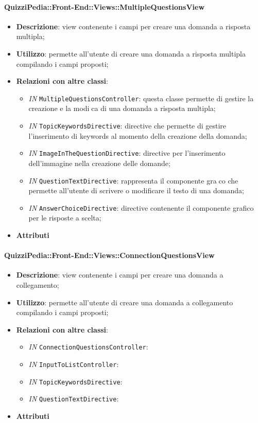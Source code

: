 \paragraph{QuizziPedia::Front-End::Views::MultipleQuestionsView}
\begin{itemize}
	\item \textbf{Descrizione}: view contenente i campi per creare una domanda a risposta multipla;
	\item \textbf{Utilizzo}: permette all'utente di creare una domanda a risposta multipla compilando i campi proposti;
	\item \textbf{Relazioni con altre classi}:
		\begin{itemize}
			\item \textit{IN} \texttt{MultipleQuestionsController}: questa classe permette di gestire la creazione e la modica di una domanda
			a risposta multipla;
			\item \textit{IN} \texttt{TopicKeywordsDirective}: directive che permette di gestire l'inserimento di keywords al momento della creazione della domanda;
			\item \textit{IN} \texttt{ImageInTheQuestionDirective}: directive per l'inserimento dell'immagine nella creazione delle domande;
			\item \textit{IN} \texttt{QuestionTextDirective}: rappresenta il componente graco che permette all'utente di scrivere o modificare il testo di una domanda;
			\item \textit{IN} \texttt{AnswerChoiceDirective}: directive contenente il componente grafico per le risposte a scelta;
		\end{itemize}
	\item \textbf{Attributi}
\end{itemize}

\paragraph{QuizziPedia::Front-End::Views::ConnectionQuestionsView}
\begin{itemize}
	\item \textbf{Descrizione}: view contenente i campi per creare una domanda a collegamento;
	\item \textbf{Utilizzo}: permette all'utente di creare una domanda a collegamento compilando i campi proposti;
	\item \textbf{Relazioni con altre classi}:
	\begin{itemize}
		\item \textit{IN} \texttt{ConnectionQuestionsController}:
		\item \textit{IN} \texttt{InputToListController}:
		\item \textit{IN} \texttt{TopicKeywordsDirective}:
		\item \textit{IN} \texttt{QuestionTextDirective}: 
	\end{itemize}
	\item \textbf{Attributi}
\end{itemize}

